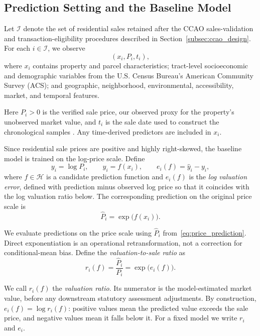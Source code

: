 \documentclass[10pt]{article}
\theoremstyle{definition}
\newcommand{\1}{\mathbf{1}}
\begin{document}
\subsection{Prediction Setting and the Baseline Model}
\label{subsec:baseline_models}

Let $\mathcal{I}$ denote the set of residential sales retained after the CCAO sales-validation and transaction-eligibility procedures described in Section~\ref{subsec:ccao_design}. For each $i\in\mathcal{I}$, we observe
\[
(x_i,P_i,t_i),
\]
where $x_i$ contains property and parcel characteristics; tract-level socioeconomic and demographic variables from the U.S. Census Bureau's American Community Survey (ACS); and geographic, neighborhood, environmental, accessibility, market, and temporal features.


Here $P_i>0$ is the verified sale price, our observed proxy for the property's unobserved market value, and $t_i$ is the sale date used to construct the chronological samples \cite{CCAOModelResAVM2026,IAAO2026ExposureRatio}. Any time-derived predictors are included in $x_i$.

Since residential sale prices are positive and highly right-skewed, the baseline model is trained on the log-price scale. Define
\begin{equation}
\label{eq:prediction_scale}
y_i=\log P_i,
\qquad
\widehat{y}_i=f(x_i),
\qquad
e_i(f)=\widehat{y}_i-y_i,
\end{equation}
{where $f\in\mathcal{H}$ is a candidate prediction function and $e_i(f)$ is the \emph{log valuation error}, defined with prediction minus observed log price so that it coincides with the log valuation ratio below.}
The corresponding prediction on the original price scale is
\begin{equation}
\label{eq:price_prediction}
\widehat{P}_i=\exp\bigl(f(x_i)\bigr).
\end{equation}


We evaluate predictions on the price scale using $\widehat{P}_i$ from~\eqref{eq:price_prediction}. Direct exponentiation is an operational retransformation, not a correction for conditional-mean bias. Define the \emph{valuation-to-sale ratio} as
\begin{equation}
\label{eq:valuation_ratio}
r_i(f)
=
\frac{\widehat{P}_i}{P_i}
=
\exp\bigl(e_i(f)\bigr).
\end{equation}


We call $r_i(f)$ the \emph{valuation ratio}. Its numerator is the model-estimated market value, before any downstream statutory assessment adjustments. By construction, $e_i(f)=\log r_i(f)$: positive values mean the predicted value exceeds the sale price, and negative values mean it falls below it. For a fixed model we write $r_i$ and $e_i$.
\end{document}
